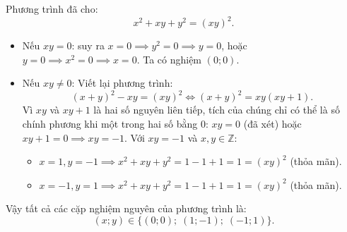 \begin{loi_giai_cau}
Phương trình đã cho:
\[x^2 + xy + y^2 = (xy)^2.\]
\begin{itemize}
\item Nếu $xy = 0$: suy ra $x = 0 \implies y^2 = 0 \implies y = 0$, hoặc $y = 0 \implies x^2 = 0 \implies x = 0$. Ta có nghiệm $(0; 0)$.
\item Nếu $xy \neq 0$:
Viết lại phương trình:
\[(x+y)^2 - xy = (xy)^2 \iff (x+y)^2 = xy(xy+1).\]
Vì $xy$ và $xy+1$ là hai số nguyên liên tiếp, tích của chúng chỉ có thể là số chính phương khi một trong hai số bằng 0:
$xy = 0$ (đã xét) hoặc $xy + 1 = 0 \implies xy = -1$.
Với $xy = -1$ và $x, y \in \mathbb{Z}$:
\begin{itemize}
\item $x = 1, y = -1 \implies x^2+xy+y^2 = 1 - 1 + 1 = 1 = (xy)^2$ (thỏa mãn).
\item $x = -1, y = 1 \implies x^2+xy+y^2 = 1 - 1 + 1 = 1 = (xy)^2$ (thỏa mãn).
\end{itemize}
\end{itemize}
Vậy tất cả các cặp nghiệm nguyên của phương trình là:
\[\boxed{(x; y) \in \{(0; 0);\; (1; -1);\; (-1; 1)\}}.\]
\end{loi_giai_cau}
